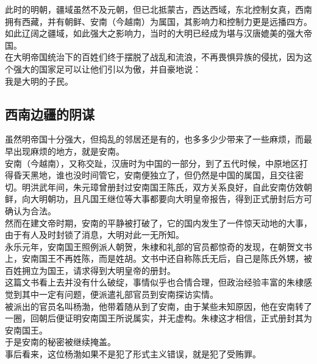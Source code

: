 \begin{multicols}{\theparacolNo}
此时的明朝，疆域虽然不及元朝，但已北抵蒙古，西达西域，东北控制女真，西南拥有西藏，并有朝鲜、安南（今越南）为属国，其影响力和控制力更是远播四方。\\

如此辽阔之疆域，如此强大之影响力，当时的大明已经成为堪与汉唐媲美的强大帝国。\\

在大明帝国统治下的百姓们终于摆脱了战乱和流浪，不再畏惧异族的侵扰，因为这个强大的国家足可以让他们引以为傲，并自豪地说：\\

我是大明的子民。\\

\subsection{西南边疆的阴谋}
虽然明帝国十分强大，但捣乱的邻居还是有的，也多多少少带来了一些麻烦，而最早出现麻烦的地方，就是安南。\\

安南（今越南），又称交趾，汉唐时为中国的一部分，到了五代时候，中原地区打得昏天黑地，谁也没时间管它，安南便独立了，但仍然是中国的属国，且交往密切。明洪武年间，朱元璋曾册封过安南国王陈氏，双方关系良好，自此安南仿效朝鲜，向大明朝功，且凡国王继位等大事都要向大明皇帝报告，得到正式册封后方可确认为合法。\\

然而在建文帝时期，安南的平静被打破了，它的国内发生了一件惊天动地的大事，由于有人及时封锁了消息，大明对此一无所知。\\

永乐元年，安南国王照例派人朝贺，朱棣和礼部的官员都惊奇的发现，在朝贺文书上，安南国王不再姓陈，而是姓胡。文书中还自称陈氏无后，自己是陈氏外甥，被百姓拥立为国王，请求得到大明皇帝的册封。\\

这篇文书看上去并没有什么破绽，事情似乎也合情合理，但政治经验丰富的朱棣感觉到其中一定有问题，便派遣礼部官员到安南探访实情。\\

被派出的官员名叫杨渤，他带着随从到了安南，由于某些未知原因，他在安南转了一圈，回朝后便证明安南国王所说属实，并无虚构。朱棣这才相信，正式册封其为安南国王。\\

于是安南的秘密被继续掩盖。\\

事后看来，这位杨渤如果不是犯了形式主义错误，就是犯了受贿罪。\\


\end{multicols}
